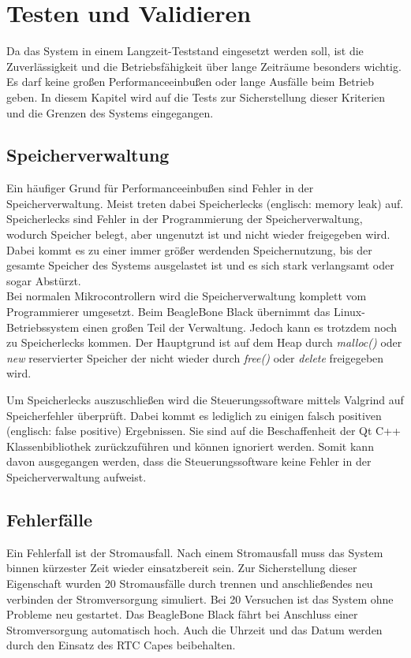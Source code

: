 
\chapter{Testen und Validieren}
\label{chapter_Testen_und_Validieren}

Da das System in einem Langzeit-Teststand eingesetzt werden soll, ist die Zuverlässigkeit und die Betriebsfähigkeit über lange Zeiträume besonders wichtig. Es darf keine großen Performanceeinbußen oder lange Ausfälle beim Betrieb geben. In diesem Kapitel wird auf die Tests zur Sicherstellung dieser Kriterien und die Grenzen des Systems eingegangen.

\section{Speicherverwaltung}

Ein häufiger Grund für Performanceeinbußen sind Fehler in der Speicherverwaltung. Meist treten dabei Speicherlecks (englisch: memory leak) auf.  Speicherlecks sind Fehler in der Programmierung der Speicherverwaltung, wodurch Speicher belegt, aber ungenutzt ist und nicht wieder freigegeben wird. Dabei kommt es zu einer immer größer werdenden Speichernutzung, bis der gesamte Speicher des Systems ausgelastet ist und es sich stark verlangsamt oder sogar Abstürzt.\\
Bei normalen Mikrocontrollern wird die Speicherverwaltung komplett vom Programmierer umgesetzt. Beim BeagleBone Black  übernimmt das Linux-Betriebssystem einen großen Teil der Verwaltung. Jedoch kann es trotzdem noch zu Speicherlecks kommen. Der Hauptgrund ist auf dem Heap durch \textit{malloc()} oder \textit{new} reservierter Speicher der nicht wieder durch \textit{free()} oder \textit{delete} freigegeben wird.\ 
  
Um Speicherlecks auszuschließen wird die Steuerungssoftware mittels Valgrind \cite{valgrind} auf Speicherfehler überprüft. Dabei kommt es lediglich zu einigen falsch positiven (englisch: false positive) Ergebnissen. Sie sind auf die Beschaffenheit der Qt C++ Klassenbibliothek zurückzuführen und können ignoriert werden. Somit kann davon ausgegangen werden, dass die Steuerungssoftware keine Fehler in der Speicherverwaltung aufweist.\\

\section{Fehlerfälle}
Ein Fehlerfall ist der Stromausfall. Nach einem Stromausfall muss das System binnen kürzester Zeit wieder einsatzbereit sein. Zur Sicherstellung dieser Eigenschaft wurden 20 Stromausfälle durch trennen und anschließendes neu verbinden der Stromversorgung simuliert. Bei 20 Versuchen ist das System ohne Probleme neu gestartet. Das BeagleBone Black fährt bei Anschluss einer Stromversorgung automatisch hoch. Auch die Uhrzeit und das Datum werden durch den Einsatz des RTC Capes beibehalten.\ 

